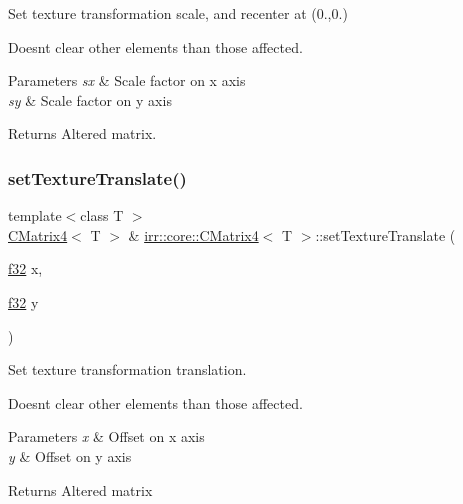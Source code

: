 Set texture transformation scale, and recenter at (0.,0.) 

Doesn\textquotesingle{}t clear other elements than those affected. 
\begin{DoxyParams}{Parameters}
{\em sx} & Scale factor on x axis \\
\hline
{\em sy} & Scale factor on y axis \\
\hline
\end{DoxyParams}
\begin{DoxyReturn}{Returns}
Altered matrix. 
\end{DoxyReturn}
\mbox{\label{classirr_1_1core_1_1CMatrix4_a2bab9633697a892f08d89c7aeee6daf6}} 
\subsubsection{\texorpdfstring{set\+Texture\+Translate()}{setTextureTranslate()}}
{\footnotesize\ttfamily template$<$class T $>$ \\
\hyperlink{classirr_1_1core_1_1CMatrix4}{C\+Matrix4}$<$ T $>$ \& \hyperlink{classirr_1_1core_1_1CMatrix4}{irr\+::core\+::\+C\+Matrix4}$<$ T $>$\+::set\+Texture\+Translate (\begin{DoxyParamCaption}\item[{\hyperlink{namespaceirr_a0277be98d67dc26ff93b1a6a1d086b07}{f32}}]{x,  }\item[{\hyperlink{namespaceirr_a0277be98d67dc26ff93b1a6a1d086b07}{f32}}]{y }\end{DoxyParamCaption})\hspace{0.3cm}{\ttfamily [inline]}}



Set texture transformation translation. 

Doesn\textquotesingle{}t clear other elements than those affected. 
\begin{DoxyParams}{Parameters}
{\em x} & Offset on x axis \\
\hline
{\em y} & Offset on y axis \\
\hline
\end{DoxyParams}
\begin{DoxyReturn}{Returns}
Altered matrix 
\end{DoxyReturn}
\mbox{\label{classirr_1_1core_1_1CMatrix4_a7d999210cc7427e9d744271e50d26c3c}} 
